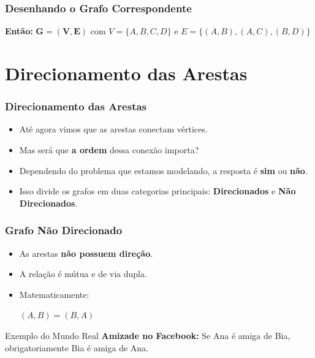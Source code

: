 \documentclass[9pt]{beamer}
\begin{document}
\begin{frame}
    \frametitle{Desenhando o Grafo Correspondente}
    \textbf{Então:} $\mathbf{G = (V,E)}$ com
    $V = \{A, B, C, D\}$ e $E = \{(A, B), (A, C), (B, D)\}$
    \vspace{0.3cm}
    \begin{center}
    \end{center}
\end{frame}

\section{Direcionamento das Arestas}

\begin{frame}
    \frametitle{Direcionamento das Arestas}
    \begin{itemize}
        \item Até agora vimos que as arestas conectam vértices.
        \item Mas será que \textbf{a ordem} dessa conexão importa?
        \item Dependendo do problema que estamos modelando, a resposta é \textbf{sim} ou \textbf{não}.
        \item Isso divide os grafos em duas categorias principais: \textbf{Direcionados} e \textbf{Não Direcionados}.
    \end{itemize}
\end{frame}

\begin{frame}
    \frametitle{Grafo Não Direcionado}
    \begin{itemize}
        \item As arestas \textbf{não possuem direção}.
        \item A relação é mútua e de via dupla.
        \item Matematicamente:
        \begin{center}
            \Large $(A, B) = (B, A)$
        \end{center}
    \end{itemize}
    \vspace{0.5cm}
    \begin{block}{Exemplo do Mundo Real}
        \textbf{Amizade no Facebook:} Se Ana é amiga de Bia, obrigatoriamente Bia é amiga de Ana.
    \end{block}
\end{frame}
\end{document}

